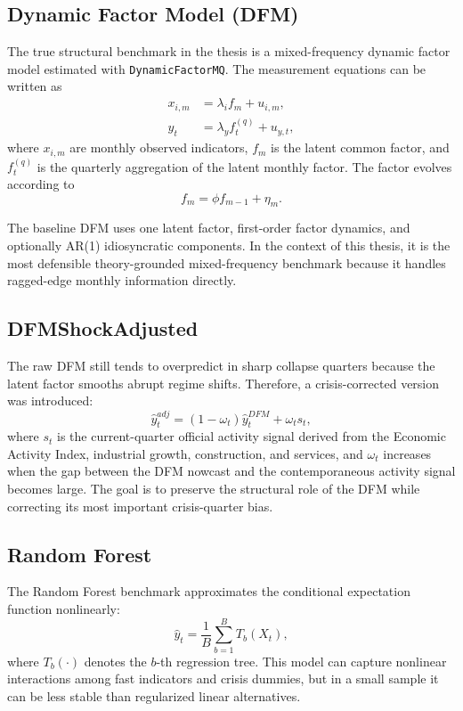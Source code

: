 \documentclass[12pt,a4paper]{report}
\begin{document}
\subsection{Dynamic Factor Model (DFM)}

The true structural benchmark in the thesis is a mixed-frequency dynamic factor model estimated with \texttt{DynamicFactorMQ}. The measurement equations can be written as
\begin{align}
    x_{i,m} &= \lambda_i f_m + u_{i,m}, \\
    y_t &= \lambda_y f_t^{(q)} + u_{y,t},
\end{align}
where $x_{i,m}$ are monthly observed indicators, $f_m$ is the latent common factor, and $f_t^{(q)}$ is the quarterly aggregation of the latent monthly factor. The factor evolves according to
\begin{equation}
    f_m = \phi f_{m-1} + \eta_m.
\end{equation}

The baseline DFM uses one latent factor, first-order factor dynamics, and optionally AR(1) idiosyncratic components. In the context of this thesis, it is the most defensible theory-grounded mixed-frequency benchmark because it handles ragged-edge monthly information directly.

\subsection{DFMShockAdjusted}

The raw DFM still tends to overpredict in sharp collapse quarters because the latent factor smooths abrupt regime shifts. Therefore, a crisis-corrected version was introduced:
\begin{equation}
    \hat{y}^{adj}_t = (1-\omega_t)\hat{y}^{DFM}_t + \omega_t s_t,
\end{equation}
where $s_t$ is the current-quarter official activity signal derived from the Economic Activity Index, industrial growth, construction, and services, and $\omega_t$ increases when the gap between the DFM nowcast and the contemporaneous activity signal becomes large. The goal is to preserve the structural role of the DFM while correcting its most important crisis-quarter bias.

\subsection{Random Forest}

The Random Forest benchmark approximates the conditional expectation function nonlinearly:
\begin{equation}
    \hat{y}_t = \frac{1}{B}\sum_{b=1}^{B} T_b(X_t),
\end{equation}
where $T_b(\cdot)$ denotes the $b$-th regression tree. This model can capture nonlinear interactions among fast indicators and crisis dummies, but in a small sample it can be less stable than regularized linear alternatives.
\end{document}
